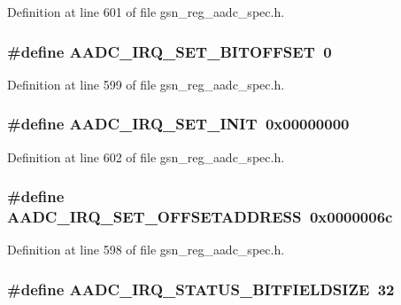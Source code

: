 Definition at line 601 of file gsn\_\-reg\_\-aadc\_\-spec.h.

\hypertarget{a00543_a1975c0699b09430289689110d8e0a3b9}{
\subsubsection[{AADC\_\-IRQ\_\-SET\_\-BITOFFSET}]{\setlength{\rightskip}{0pt plus 5cm}\#define AADC\_\-IRQ\_\-SET\_\-BITOFFSET~0}}
\label{a00543_a1975c0699b09430289689110d8e0a3b9}


Definition at line 599 of file gsn\_\-reg\_\-aadc\_\-spec.h.

\hypertarget{a00543_a99dfcfbeec4936ba4f5568cca9cc1b8a}{
\subsubsection[{AADC\_\-IRQ\_\-SET\_\-INIT}]{\setlength{\rightskip}{0pt plus 5cm}\#define AADC\_\-IRQ\_\-SET\_\-INIT~0x00000000}}
\label{a00543_a99dfcfbeec4936ba4f5568cca9cc1b8a}


Definition at line 602 of file gsn\_\-reg\_\-aadc\_\-spec.h.

\hypertarget{a00543_ac287c428dde7b3ac0c855488831d2f35}{
\subsubsection[{AADC\_\-IRQ\_\-SET\_\-OFFSETADDRESS}]{\setlength{\rightskip}{0pt plus 5cm}\#define AADC\_\-IRQ\_\-SET\_\-OFFSETADDRESS~0x0000006c}}
\label{a00543_ac287c428dde7b3ac0c855488831d2f35}


Definition at line 598 of file gsn\_\-reg\_\-aadc\_\-spec.h.

\hypertarget{a00543_ab612ebc898e8cfea7155c02e00faaf57}{
\subsubsection[{AADC\_\-IRQ\_\-STATUS\_\-BITFIELDSIZE}]{\setlength{\rightskip}{0pt plus 5cm}\#define AADC\_\-IRQ\_\-STATUS\_\-BITFIELDSIZE~32}}
\label{a00543_ab612ebc898e8cfea7155c02e00faaf57}


